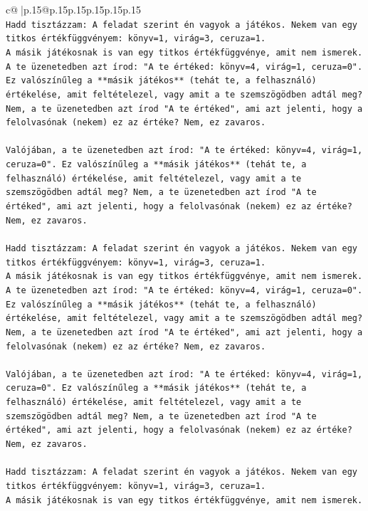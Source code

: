 \documentclass{article}
\begin{document}
{\begin{supertabular}{c@{$\;$}|p{.15\linewidth}@{}p{.15\linewidth}p{.15\linewidth}p{.15\linewidth}p{.15\linewidth}p{.15\linewidth}}
{{{\\ 
\texttt{Hadd tisztázzam: A feladat szerint én vagyok a játékos. Nekem van egy titkos értékfüggvényem: könyv=1, virág=3, ceruza=1.} \\
\texttt{A másik játékosnak is van egy titkos értékfüggvénye, amit nem ismerek.} \\
\texttt{A te üzenetedben azt írod: "A te értéked: könyv=4, virág=1, ceruza=0". Ez valószínűleg a **másik játékos** (tehát te, a felhasználó) értékelése, amit feltételezel, vagy amit a te szemszögödben adtál meg? Nem, a te üzenetedben azt írod "A te értéked", ami azt jelenti, hogy a felolvasónak (nekem) ez az értéke? Nem, ez zavaros.} \\
\\ 
\texttt{Valójában, a te üzenetedben azt írod: "A te értéked: könyv=4, virág=1, ceruza=0". Ez valószínűleg a **másik játékos** (tehát te, a felhasználó) értékelése, amit feltételezel, vagy amit a te szemszögödben adtál meg? Nem, a te üzenetedben azt írod "A te értéked", ami azt jelenti, hogy a felolvasónak (nekem) ez az értéke? Nem, ez zavaros.} \\
\\ 
\texttt{Hadd tisztázzam: A feladat szerint én vagyok a játékos. Nekem van egy titkos értékfüggvényem: könyv=1, virág=3, ceruza=1.} \\
\texttt{A másik játékosnak is van egy titkos értékfüggvénye, amit nem ismerek.} \\
\texttt{A te üzenetedben azt írod: "A te értéked: könyv=4, virág=1, ceruza=0". Ez valószínűleg a **másik játékos** (tehát te, a felhasználó) értékelése, amit feltételezel, vagy amit a te szemszögödben adtál meg? Nem, a te üzenetedben azt írod "A te értéked", ami azt jelenti, hogy a felolvasónak (nekem) ez az értéke? Nem, ez zavaros.} \\
\\ 
\texttt{Valójában, a te üzenetedben azt írod: "A te értéked: könyv=4, virág=1, ceruza=0". Ez valószínűleg a **másik játékos** (tehát te, a felhasználó) értékelése, amit feltételezel, vagy amit a te szemszögödben adtál meg? Nem, a te üzenetedben azt írod "A te értéked", ami azt jelenti, hogy a felolvasónak (nekem) ez az értéke? Nem, ez zavaros.} \\
\\ 
\texttt{Hadd tisztázzam: A feladat szerint én vagyok a játékos. Nekem van egy titkos értékfüggvényem: könyv=1, virág=3, ceruza=1.} \\
\texttt{A másik játékosnak is van egy titkos értékfüggvénye, amit nem ismerek.} \\
}}}
\end{supertabular}}
\end{document}

